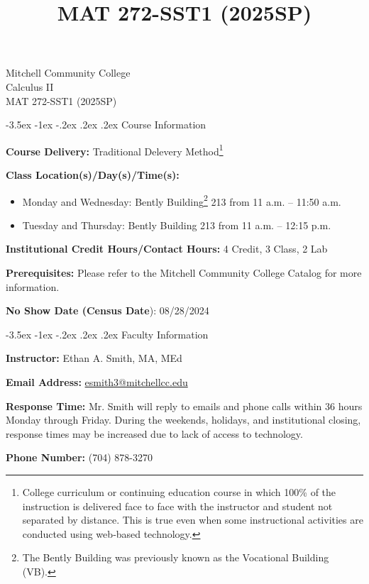 \documentclass[11pt]{article}
\title{MAT 272-SST1 (2025SP)}
\makeatletter
\renewcommand\section{\@startsection{section}{1}{0pt}%
  {-3.5ex \@plus -1ex \@minus -.2ex}%
  {.2ex \@plus.2ex}%
  {\normalfont\Large\bfseries}} %
\makeatother
\begin{document}
\begin{center}
    {\huge Mitchell Community College} \\[6pt]
    {\Large Calculus II} \\[6pt]
    {\Large MAT 272-SST1 (2025SP)}
\end{center}

\section{Course Information}

\textbf{Course Delivery:} Traditional Delevery Method\footnote{College curriculum or continuing education course in which 100\% of the instruction is delivered face to face with the instructor and student not  separated by distance. This is true even when some instructional activities are conducted using web‐based technology.}

\textbf{Class Location(s)/Day(s)/Time(s):}

\begin{itemize}
\item Monday and Wednesday: Bently Building\footnote{The Bently Building was previously known as the Vocational Building (VB).} 213 from 11 a.m. -- 11:50 a.m.
\item Tuesday and Thursday: Bently Building 213 from 11 a.m. -- 12:15 p.m.
\end{itemize}

\textbf{Institutional Credit Hours/Contact Hours:} 4 Credit, 3 Class, 2 Lab

\textbf{Prerequisites:} Please refer to the Mitchell Community College Catalog for more information.

\textbf{No Show Date (Census Date}): 08/28/2024

\section{Faculty Information}

\textbf{Instructor:} Ethan A. Smith, MA, MEd

\textbf{Email Address:} \href{mailto:esmith3@mitchellcc.edu}{esmith3@mitchellcc.edu}

\textbf{Response Time:} Mr. Smith will reply to emails and phone calls within 36 hours Monday through Friday. During the weekends, holidays, and institutional closing, response times may be increased due to lack of access to technology.

\textbf{Phone Number:} (704) 878-3270
\end{document}
